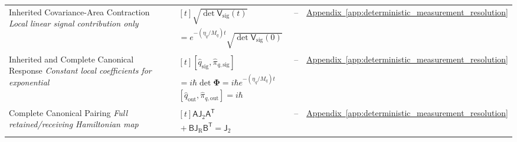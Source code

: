 \begin{longtable}{@{} p{4.5cm} p{6cm} c p{4cm} @{}}
{\raggedright Inherited Covariance-Area Contraction \newline \textit{Local linear signal contribution only}\par} & {\raggedright $\begin{gathered}[t]\sqrt{\det\mathsf V_{\mathrm{sig}}(t)} \\ =e^{-(\eta_q/M_q)t}\sqrt{\det\mathsf V_{\mathrm{sig}}(0)}\end{gathered}$\par} & -- & {\raggedright \hyperref[app:deterministic_measurement_resolution]{Appendix~\ref*{app:deterministic_measurement_resolution}}\par} \\

{\raggedright Inherited and Complete Canonical Response \newline \textit{Constant local coefficients for exponential}\par} & {\raggedright $\begin{gathered}[t][\widehat q_{\mathrm{sig}},\widehat\pi_{q,\mathrm{sig}}] \\ =i\hbar\det\boldsymbol\Phi=i\hbar e^{-(\eta_q/M_q)t} \\ [\widehat q_{\mathrm{out}},\widehat\pi_{q,\mathrm{out}}]=i\hbar\end{gathered}$\par} & -- & {\raggedright \hyperref[app:deterministic_measurement_resolution]{Appendix~\ref*{app:deterministic_measurement_resolution}}\par} \\

{\raggedright Complete Canonical Pairing \newline \textit{Full retained/receiving Hamiltonian map}\par} & {\raggedright $\begin{gathered}[t]\mathsf A\mathsf J_2\mathsf A^{\mathsf T} \\ {}+\mathsf B\mathsf J_{\mathrm R}\mathsf B^{\mathsf T}=\mathsf J_2\end{gathered}$\par} & -- & {\raggedright \hyperref[app:deterministic_measurement_resolution]{Appendix~\ref*{app:deterministic_measurement_resolution}}\par} \\


\end{longtable}
